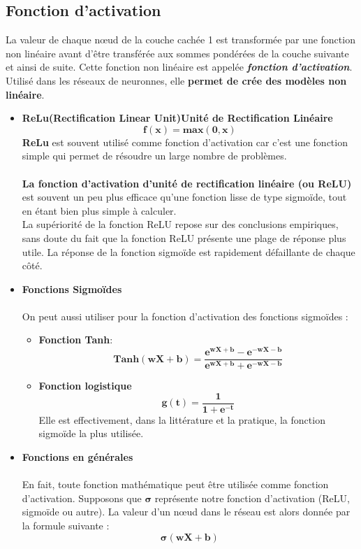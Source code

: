 \documentclass[french]{article}
\begin{document}
\subsection{Fonction d'activation} 
La valeur de chaque nœud de la couche cachée 1 est transformée par une fonction non linéaire avant d'être transférée aux sommes pondérées de la couche suivante et ainsi de suite. Cette fonction non linéaire est appelée \textbf{\textit{fonction d'activation}}.\\
Utilisé dans les réseaux de neuronnes, elle \textbf{permet de crée des modèles non linéaire}.\\
\begin{itemize}[label=\textbullet, font=\LARGE \color{red}]
\item \textbf{ReLu(Rectification Linear Unit)Unité de Rectification Linéaire}
$$\bm{f(x)=max(0,x)}$$
\textbf{ReLu}  est souvent utilisé comme fonction d'activation car c'est une fonction simple qui permet de résoudre un large nombre de problèmes.\\\\ \textbf{La fonction d'activation d'unité de rectification linéaire (ou ReLU)} est souvent un peu plus efficace qu'une fonction lisse de type sigmoïde, tout en étant bien plus simple à calculer.\\ La supériorité de la fonction ReLU repose sur des conclusions empiriques, sans doute du fait que la fonction ReLU présente une plage de réponse plus utile. La réponse de la fonction sigmoïde est rapidement défaillante de chaque côté.\\

\item \textbf{Fonctions Sigmoïdes}\\\\ 
On peut aussi utiliser pour la fonction d'activation des fonctions sigmoïdes : 
\begin{itemize}[label=$\star$]
\item \textbf{Fonction Tanh}:$$\bm{Tanh(wX + b) = 
\frac{e^{wX + b}-e^{-wX - b}}
{e^{wX + b}+e^{-wX - b}}}$$
\item \textbf{Fonction logistique}
$$\bm{g(t)=\frac{1}{1+e^{-t}}}$$
Elle est effectivement, dans la littérature et la pratique, la fonction sigmoïde la plus utilisée.\\
\end{itemize}

\item \textbf{Fonctions en générales}\\\\
En fait, toute fonction mathématique peut être utilisée comme fonction d'activation. Supposons que $\bm{\sigma}$
représente notre fonction d'activation (ReLU, sigmoïde ou autre). La valeur d'un nœud dans le réseau est alors donnée par la formule suivante :
$$\bm{\sigma(wX+b)}$$
\end{itemize}
\end{document}
